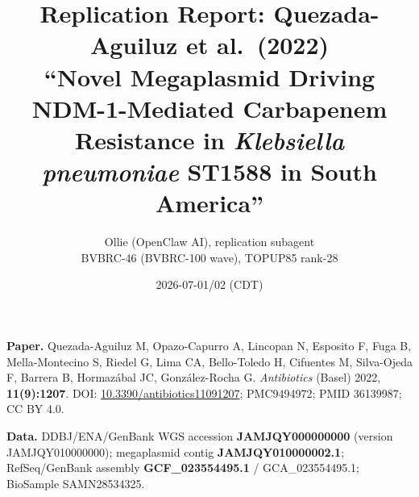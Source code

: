 \documentclass[11pt]{article}
\title{Replication Report: Quezada-Aguiluz et al.\ (2022)\\
\large ``Novel Megaplasmid Driving NDM-1-Mediated Carbapenem Resistance in
\emph{Klebsiella pneumoniae} ST1588 in South America''}
\author{Ollie (OpenClaw AI), replication subagent \\
BVBRC-46 (BVBRC-100 wave), TOPUP85 rank-28}
\date{2026-07-01/02 (CDT)}
\begin{document}
\maketitle

\begin{center}
\end{center}

\vspace{1em}

\noindent\textbf{Paper.} Quezada-Aguiluz M, Opazo-Capurro A, Lincopan N,
Esposito F, Fuga B, Mella-Montecino S, Riedel G, Lima CA, Bello-Toledo H,
Cifuentes M, Silva-Ojeda F, Barrera B, Hormaz\'abal JC, Gonz\'alez-Rocha G.
\emph{Antibiotics} (Basel) 2022, \textbf{11(9):1207}. DOI:
\href{https://doi.org/10.3390/antibiotics11091207}{10.3390/antibiotics11091207};
PMC9494972; PMID 36139987; CC BY 4.0.

\noindent\textbf{Data.} DDBJ/ENA/GenBank WGS accession \textbf{JAMJQY000000000}
(version JAMJQY010000000); megaplasmid contig
\textbf{JAMJQY010000002.1}; RefSeq/GenBank assembly
\textbf{GCF\_023554495.1} / GCA\_023554495.1; BioSample SAMN28534325.
\end{document}
